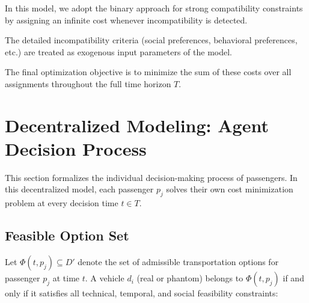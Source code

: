 \documentclass[11pt,a4paper]{article}
\begin{document}
In this model, we adopt the binary approach for strong compatibility constraints by assigning an infinite cost whenever incompatibility is detected.

The detailed incompatibility criteria (social preferences, behavioral preferences, etc.) are treated as exogenous input parameters of the model.

The final optimization objective is to minimize the sum of these costs over all assignments throughout the full time horizon $T$.

\section{Decentralized Modeling: Agent Decision Process}

This section formalizes the individual decision-making process of passengers. In this decentralized model, each passenger $p_j$ solves their own cost minimization problem at every decision time $t \in T$.

\subsection{Feasible Option Set}

Let $\Phi(t,p_j)\subseteq D'$ denote the set of admissible transportation options for passenger $p_j$ at time $t$. A vehicle $d_i$ (real or phantom) belongs to $\Phi(t,p_j)$ if and only if it satisfies all technical, temporal, and social feasibility constraints:
\end{document}
